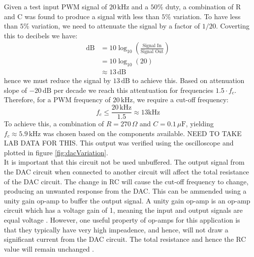 \documentclass[%
 reprint,
 amsmath,amssymb,
 aps,
]{revtex4-2}
\begin{document}
    Given a test input PWM signal of $20\,\text{kHz}$ and a $50$\% duty, a combination of R and C was found to produce a signal with less than $5$\% variation. To have less than $5$\% variation, we need to attenuate the signal by a factor of $1/20$. Coverting this to decibels we have:
    \begin{align}
        \text{dB} &= 10 \log_{10}\left( \frac{\text{Signal In}}{\text{Signal Out}} \right)\\
                  &= 10 \log_{10}\left( 20 \right)\nonumber\\
                  &\approx 13 \,\text{dB}\nonumber
    \end{align}hence we must reduce the signal by $13\,\text{dB}$ to achieve this. Based on attenuation slope of $-20\,\text{dB}$ per decade we reach this attentuation for frequencies $1.5 \cdot f_c$. Therefore, for a PWM frequency of $20\,\text{kHz}$, we require a cut-off frequency:
    \begin{equation}
        f_c \le \frac{20\,\text{kHz}}{1.5} \approx 13 \text{kHz}
    \end{equation}To achieve this, a combination of $R=270\,\Omega$ and $C=0.1\,\mu\text{F}$, yielding $f_c\approx5.9\,\text{kHz}$ was chosen based on the components available. NEED TO TAKE LAB DATA FOR THIS. This output was verified using the oscilloscope and plotted in figure \ref{fig:dacVariation}.\\

    It is important that this circuit not be used unbuffered. The output signal from the DAC circuit when connected to another circuit will affect the total resistance of the DAC circuit. The change in RC will cause the cut-off frequency to change, producing an unwanted response from the DAC. This can be ammended using a unity gain op-amp to buffer the output signal. A unity gain op-amp is an op-amp circuit which has a voltage gain of 1, meaning the input and output signals are equal voltage \cite{unityGain}. However, one useful property of op-amps for this application is that they typically have very high impeadence, and hence, will not draw a significant current from the DAC circuit. The total resistance and hence the RC value will remain unchanged \cite{unityGain}.
\end{document}
